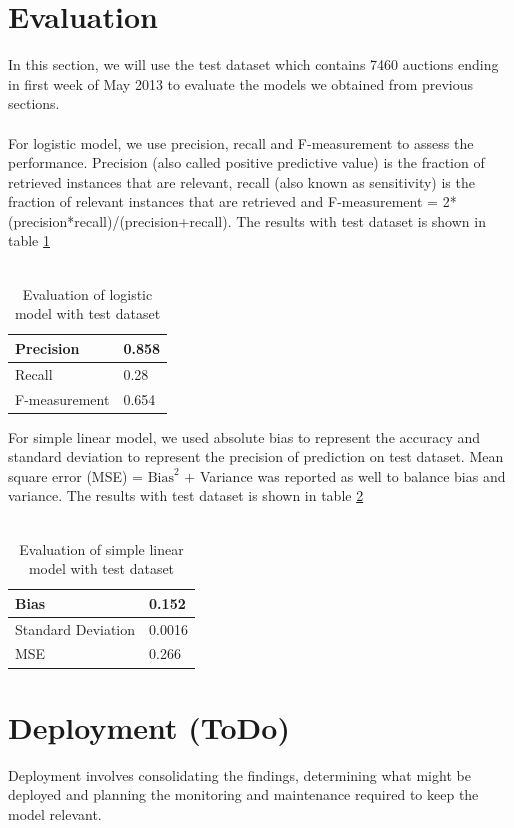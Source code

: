 \documentclass[CEJM,PDF]{cej} %
\begin{document}
\section{Evaluation}
In this section, we will use the test dataset which contains 7460 auctions ending in first week of May 2013 to evaluate the models we obtained from previous sections. \\
\\
For logistic model, we use precision, recall and F-measurement to assess the performance. Precision (also called positive predictive value) is the fraction of retrieved instances that are relevant, recall (also known as sensitivity) is the fraction of relevant instances that are retrieved and F-measurement = 2* (precision*recall)/(precision+recall). The results with test dataset is shown in table \ref{logit}\\
\\
\begin{table}[h]
\centering
\caption{Evaluation of logistic model with test dataset}
\label{logit}
\begin{tabular}{@{}|l|l|@{}}
\toprule
\hline
Precision  & 0.858 \\ \midrule
\hline
Recall & 0.28  \\
\hline
F-measurement  & 0.654\\ \bottomrule
\hline
\end{tabular}
\end{table}
For simple linear model, we used absolute bias to represent the accuracy and standard deviation to represent the precision of prediction on test dataset. Mean square error (MSE) = $\text{Bias}^2$ + Variance was reported as well to balance bias and variance. The results with test dataset is shown in table \ref{lm}\\
\\
\begin{table}[h]
\centering
\caption{Evaluation of simple linear model with test dataset}
\label{lm}
\begin{tabular}{@{}|l|l|@{}}
\toprule
\hline
Bias  & 0.152 \\ \midrule
\hline
Standard Deviation & 0.0016  \\
\hline
MSE  & 0.266\\ \bottomrule
\hline
\end{tabular}
\end{table}

\section{Deployment (ToDo)}
Deployment involves consolidating the findings, determining what might be deployed and planning the monitoring and maintenance required to keep the model relevant.
\end{document}
